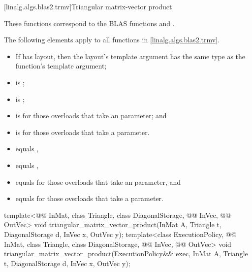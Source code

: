 [linalg.algs.blas2.trmv]{Triangular matrix-vector product}

\pnum
\begin{note}
These functions correspond to the BLAS functions
 and \supercite{blas2}.
\end{note}

\pnum
The following elements apply to all functions in \ref{linalg.algs.blas2.trmv}.

\pnum
\mandates
\begin{itemize}
\item
If  has  layout,
then the layout's  template argument has
the same type as the function's  template argument;
\item
{}
is ;
\item
{}
is ;
\item
{}
is  for those overloads that take an  parameter; and
\item
{}
is  for those overloads that take a  parameter.
\end{itemize}

\pnum
\expects
\begin{itemize}
\item
{} equals ,
\item
{} equals ,
\item
{} equals  for those overloads that take an  parameter, and
\item
{} equals  for those overloads that take a  parameter.
\end{itemize}

%
\begin{itemdecl}
template<@@ InMat, class Triangle, class DiagonalStorage, @@ InVec,
         @@ OutVec>
  void triangular_matrix_vector_product(InMat A, Triangle t, DiagonalStorage d, InVec x, OutVec y);
template<class ExecutionPolicy,
         @@ InMat, class Triangle, class DiagonalStorage, @@ InVec,
         @@ OutVec>
  void triangular_matrix_vector_product(ExecutionPolicy&& exec,
                                        InMat A, Triangle t, DiagonalStorage d, InVec x, OutVec y);
\end{itemdecl}

